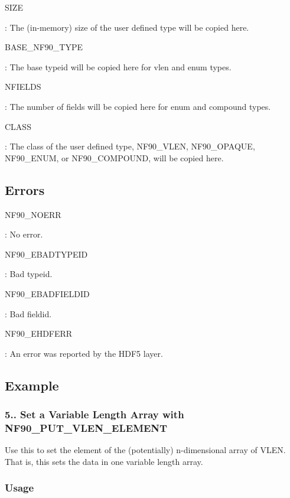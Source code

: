 {\ttfamily S\+I\+ZE}

\+: The (in-\/memory) size of the user defined type will be copied here.

{\ttfamily B\+A\+S\+E\+\_\+\+N\+F90\+\_\+\+T\+Y\+PE}

\+: The base typeid will be copied here for vlen and enum types.

{\ttfamily N\+F\+I\+E\+L\+DS}

\+: The number of fields will be copied here for enum and compound types.

{\ttfamily C\+L\+A\+SS}

\+: The class of the user defined type, N\+F90\+\_\+\+V\+L\+EN, N\+F90\+\_\+\+O\+P\+A\+Q\+UE, N\+F90\+\_\+\+E\+N\+UM, or N\+F90\+\_\+\+C\+O\+M\+P\+O\+U\+ND, will be copied here.

\subsection*{Errors}

{\ttfamily N\+F90\+\_\+\+N\+O\+E\+RR}

\+: No error.

{\ttfamily N\+F90\+\_\+\+E\+B\+A\+D\+T\+Y\+P\+E\+ID}

\+: Bad typeid.

{\ttfamily N\+F90\+\_\+\+E\+B\+A\+D\+F\+I\+E\+L\+D\+ID}

\+: Bad fieldid.

{\ttfamily N\+F90\+\_\+\+E\+H\+D\+F\+E\+RR}

\+: An error was reported by the H\+D\+F5 layer.

\subsection*{Example}\hypertarget{f90-user-defined-data-types_f90-set-a-variable-length-array-with-nf90_put_vlen_element}{}\subsubsection{5.. Set a Variable Length Array with N\+F90\+\_\+\+P\+U\+T\+\_\+\+V\+L\+E\+N\+\_\+\+E\+L\+E\+M\+E\+NT}\label{f90-user-defined-data-types_f90-set-a-variable-length-array-with-nf90_put_vlen_element}
Use this to set the element of the (potentially) n-\/dimensional array of V\+L\+EN. That is, this sets the data in one variable length array.

\subsubsection*{Usage}


